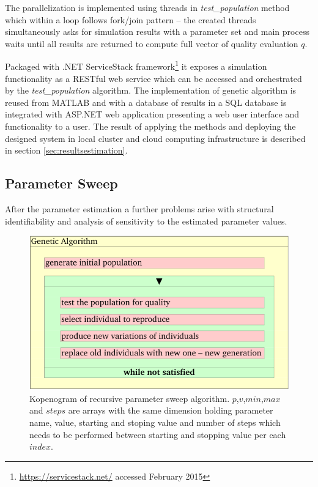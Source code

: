 The parallelization is implemented using threads in \emph{test\_population} method which within a loop follows fork/join pattern -- the created threads simultaneously asks for simulation results with a parameter set and main process waits until all results are returned to compute full vector of quality evaluation $q$.

Packaged with .NET ServiceStack framework\footnote{\url{https://servicestack.net/} accessed February 2015} it exposes a simulation functionality as a RESTful web service which can be accessed and orchestrated by the \emph{test\_population} algorithm. The implementation of genetic algorithm is reused from MATLAB \texttrademark and with a database of results in a SQL database is integrated with ASP.NET web application presenting a web user interface and functionality to a user.
The result of applying the methods and deploying the designed system in local cluster and cloud computing infrastructure is described in section \ref{sec:resultsestimation}.

\subsection{Parameter Sweep}
\label{sec:sensitivity}
After the parameter estimation a further problems arise with structural identifiability and analysis of sensitivity to the estimated parameter values\cite[p.~176]{khoo2000}. 

\begin{figure}[hbt]
    \centering
     \includegraphics[page=4]{chapter3/GA-kopenogram-crop.pdf}    
    \caption{Kopenogram of recursive parameter sweep algorithm. $p$,$v$,$min$,$max$ and $steps$ are arrays with the same dimension holding parameter name, value, starting and stoping value and number of steps which needs to be performed between starting and stopping value per each $index$.    
    }
    \label{fig:paramsweep}
\end{figure}

